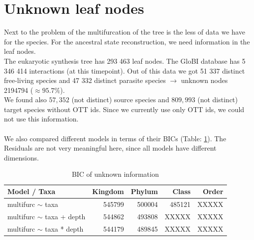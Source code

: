   \section{Unknown leaf nodes}
    Next to the problem of the multifurcation of the tree is the less of data we have for the species.
      For the ancestral state reconstruction, we need information in the leaf nodes. \\
    The eukaryotic synthesis tree has 293 463 leaf nodes. The GloBI database has 5 346 414 interactions 
      (at this timepoint). Out of this data we got 51 337 distinct free-living species and 47 332 
      distinct parasite species $\rightarrow$ unknown nodes 2194794 ($\approx 95.7\%$). \\
    We found also $57,352$ (not distinct) source species and $809,993$ (not distinct) target
      species without OTT ids. Since we currently use only OTT ids, we could not use this information. \\
     \\
    We also compared different models in terms of their BICs (Table: \ref{table:BIC unknown information}). 
      The Residuals are not very meaningful here, since all models have different dimensions.



      \begin{table}[h!]
        \begin{center}
          \begin{tabular}{ |l|r|r|r|r| }
            \hline
            Model / Taxa & Kingdom & Phylum & Class & Order \\
            \hline \hline
            multifurc $\sim$ taxa & 545799 & 500004 & 485121 & XXXXX\\
            \hline
            multifurc $\sim$ taxa + depth & 544862 & 493808 & XXXXX & XXXXX \\
            \hline
            multifurc $\sim$ taxa * depth & 544179 & 489845 & XXXXX & \cellcolor{green!60}XXXXX \\
            \hline
          \end{tabular} 
        \end{center}
        \caption{BIC of unknown information}
        \label{table:BIC unknown information} 
      \end{table}


